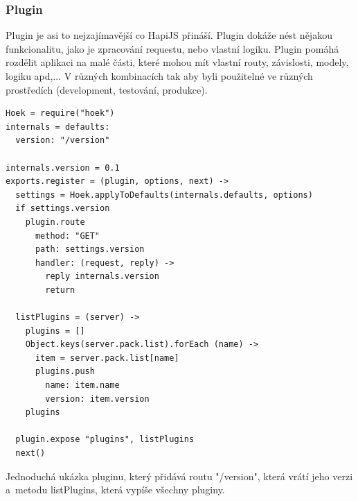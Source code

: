\documentclass[a4paper,12pt,twoside,BCOR=10mm]{article}
\newenvironment{codeframe}{%
  \begin{Sbox} 
    \begin{minipage} 
      {\columnwidth-\leftmargin-\rightmargin-2\fboxsep-2\fboxrule-4pt} 
}{%

  \end{minipage} 
  \end{Sbox} 
  \begin{center} 
    \fcolorbox{black}{codeback}{\TheSbox} 
  \end{center} 
}
\begin{document}
\subsubsection{Plugin}
Plugin je asi to nejzajímavější co HapiJS přináší. Plugin dokáže nést nějakou funkcionalitu, jako je zpracování requestu, nebo vlastní logiku. Plugin pomáhá rozdělit aplikaci na malé části, které mohou mít vlastní routy, závislosti, modely, logiku apd,... V různých kombinacích tak aby byli použitelné ve různých prostředích (development, testování, produkce).\cite{hapiJSDOC}
\begin{codeframe}
  \begin{Verbatim}
Hoek = require("hoek")
internals = defaults:
  version: "/version"

internals.version = 0.1
exports.register = (plugin, options, next) ->
  settings = Hoek.applyToDefaults(internals.defaults, options)
  if settings.version
    plugin.route
      method: "GET"
      path: settings.version
      handler: (request, reply) ->
        reply internals.version
        return

  listPlugins = (server) ->
    plugins = []
    Object.keys(server.pack.list).forEach (name) ->
      item = server.pack.list[name]
      plugins.push
        name: item.name
        version: item.version
    plugins

  plugin.expose "plugins", listPlugins
  next()
\end{Verbatim}
  \end{codeframe}
Jednoduchá ukázka pluginu, který přidává routu "/version", která vrátí jeho verzi a~metodu listPlugins, která vypíše všechny pluginy.
\end{document}
